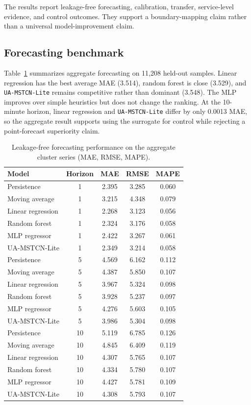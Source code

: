 The results report leakage-free forecasting, calibration, transfer, service-level evidence, and control outcomes. They support a boundary-mapping claim rather than a universal model-improvement claim.

\subsection{Forecasting benchmark}

Table~\ref{tab:forecast-leakage-free} summarizes aggregate forecasting on 11{,}208 held-out samples. Linear regression has the best average MAE (3.514), random forest is close (3.529), and \texttt{UA-MSTCN-Lite} remains competitive rather than dominant (3.548). The MLP improves over simple heuristics but does not change the ranking. At the 10-minute horizon, linear regression and \texttt{UA-MSTCN-Lite} differ by only 0.0013 MAE, so the aggregate result supports using the surrogate for control while rejecting a point-forecast superiority claim.

\begin{table}[htbp]
  \centering
  \caption{Leakage-free forecasting performance on the aggregate cluster series (MAE, RMSE, MAPE).}
  \label{tab:forecast-leakage-free}
  \scriptsize
  \setlength{\tabcolsep}{2pt}
  \renewcommand{\arraystretch}{0.96}
  \begin{tabular}{lcccc}
    \toprule
    Model & Horizon & MAE & RMSE & MAPE \\
    \midrule
    Persistence & 1 & 2.395 & 3.285 & 0.060 \\
    Moving average & 1 & 3.215 & 4.348 & 0.079 \\
    Linear regression & 1 & 2.268 & 3.123 & 0.056 \\
    Random forest & 1 & 2.324 & 3.176 & 0.058 \\
    MLP regressor & 1 & 2.422 & 3.267 & 0.061 \\
    UA-MSTCN-Lite & 1 & 2.349 & 3.214 & 0.058 \\
    Persistence & 5 & 4.569 & 6.162 & 0.112 \\
    Moving average & 5 & 4.387 & 5.850 & 0.107 \\
    Linear regression & 5 & 3.967 & 5.324 & 0.098 \\
    Random forest & 5 & 3.928 & 5.237 & 0.097 \\
    MLP regressor & 5 & 4.276 & 5.603 & 0.105 \\
    UA-MSTCN-Lite & 5 & 3.986 & 5.304 & 0.098 \\
    Persistence & 10 & 5.119 & 6.785 & 0.126 \\
    Moving average & 10 & 4.845 & 6.409 & 0.119 \\
    Linear regression & 10 & 4.307 & 5.765 & 0.107 \\
    Random forest & 10 & 4.334 & 5.780 & 0.107 \\
    MLP regressor & 10 & 4.427 & 5.781 & 0.109 \\
    UA-MSTCN-Lite & 10 & 4.308 & 5.793 & 0.107 \\
    \bottomrule
  \end{tabular}
\end{table}

